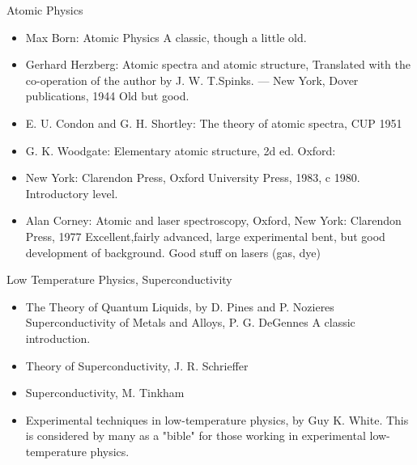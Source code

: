\documentclass[10pt,a4paper]{book}
\theoremstyle{definition}
\begin{document}
Atomic Physics
\begin{itemize}
\item 
Max Born: Atomic Physics
A classic, though a little old.
\item Gerhard Herzberg: Atomic spectra and atomic structure, Translated with the co-operation of the author by J. W. T.Spinks. — New York, Dover publications, 1944
Old but good.
\item E. U. Condon and G. H. Shortley: The theory of atomic spectra, CUP 1951
\item G. K. Woodgate: Elementary atomic structure, 2d ed. Oxford: \item New York: Clarendon Press, Oxford University Press, 1983, c 1980. Introductory level.
\item Alan Corney: Atomic and laser spectroscopy, Oxford, New York: Clarendon Press, 1977
Excellent,fairly advanced, large experimental bent, but good development of background.  Good stuff on lasers (gas, dye)
\end{itemize}


Low Temperature Physics, Superconductivity
\begin{itemize}
\item  The Theory of Quantum Liquids, by D. Pines and P. Nozieres
Superconductivity of Metals and Alloys, P. G. DeGennes A classic introduction.
\item Theory of Superconductivity, J. R. Schrieffer
\item Superconductivity, M. Tinkham
\item Experimental techniques in low-temperature physics, by Guy K. White.
This is considered by many as a "bible" for those working in experimental low-temperature physics.
\end{itemize}




\newpage
\end{document}
